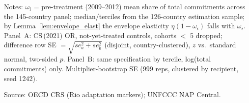 \begin{table}[H]
\centering
\caption{Envelope response by recipient size}
\label{tab:lemma2_size}
\par\vspace{4pt}
\begin{minipage}{\linewidth}\footnotesize
Notes: $\omega_i$ = pre-treatment (2009--2012) mean share of total commitments across the 145-country panel; median/terciles from the 126-country estimation sample; by Lemma~\ref{lem:envelope_elast} the envelope elasticity $\eta(1-\omega_i)$ falls with $\omega_i$. Panel~A: CS\,(2021) OR, not-yet-treated controls, cohorts $<$ 5 dropped; difference row SE $=\sqrt{se_a^2+se_b^2}$ (disjoint, country-clustered), $z$ vs.\ standard normal, two-sided $p$. Panel~B: same specification by tercile, log(total commitments) only. Multiplier-bootstrap SE (999 reps, clustered by recipient, seed 1242).\par
Source: OECD CRS (Rio adaptation markers); UNFCCC NAP Central.
\end{minipage}
\end{table}
